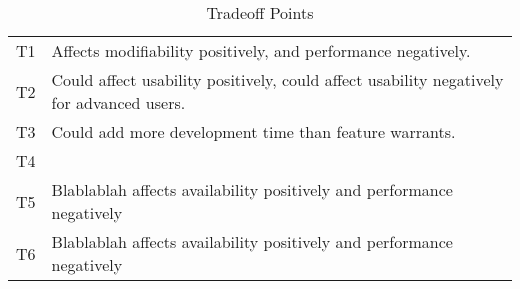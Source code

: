 \begin{table}[H]
	\begin{center}
		\begin{tabular}{| c | p{14cm} | }
    		\hline
		T1	&	Affects modifiability positively, and performance negatively.		\\
		T2	& 	Could affect usability positively, could affect usability negatively for advanced users.\\	
		T3	&	Could add more development time than feature warrants. \\
		T4	& 			\\					
		T5	&	Blablablah affects availability positively and performance negatively		\\
		T6	& 	Blablablah affects availability positively and performance negatively		\\
                \hline
    	\end{tabular}
	\end{center}
	\label{tab:tradeoffPoints}
	\caption{Tradeoff Points}
\end{table}
